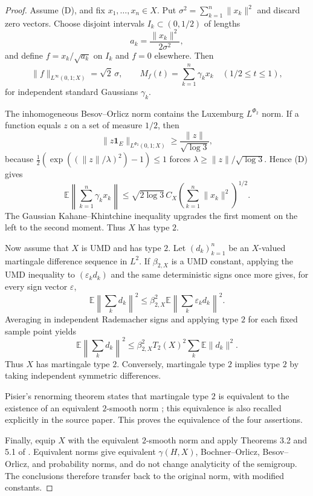 \documentclass[11pt]{article}
\newcommand{\E}{\mathbb E}
\newcommand{\PhiTwo}{\Phi_2}
\begin{document}
\begin{proof}
Assume (D), and fix $x_1,\ldots,x_n\in X$.  Put
$\sigma^2=\sum_{k=1}^n\|x_k\|^2$ and discard zero vectors.  Choose disjoint
intervals $I_k\subset(0,1/2)$ of lengths
\[
 a_k=\frac{\|x_k\|^2}{2\sigma^2},
\]
and define $f=x_k/\sqrt{a_k}$ on $I_k$ and $f=0$ elsewhere.  Then
\[
 \|f\|_{L^\infty(0,1;X)}=\sqrt{2}\,\sigma,
 \qquad
 M_f(t)=\sum_{k=1}^n\gamma_kx_k\quad(1/2\le t\le1),
\]
for independent standard Gaussians $\gamma_k$.

The inhomogeneous Besov--Orlicz norm contains the Luxemburg
$L^{\PhiTwo}$ norm.  If a function equals $z$ on a set of measure $1/2$, then
\[
 \|z\mathbf1_E\|_{L^{\PhiTwo}(0,1;X)}
 \ge \frac{\|z\|}{\sqrt{\log 3}},
\]
because $\frac12(\exp((\|z\|/\lambda)^2)-1)\le1$ forces
$\lambda\ge\|z\|/\sqrt{\log3}$.  Hence (D) gives
\[
 \E\left\|\sum_{k=1}^n\gamma_kx_k\right\|
 \le \sqrt{2\log3}\,C_X
       \left(\sum_{k=1}^n\|x_k\|^2\right)^{1/2}.
\]
The Gaussian Kahane--Khintchine inequality upgrades the first moment on the
left to the second moment.  Thus $X$ has type $2$.

Now assume that $X$ is UMD and has type $2$.  Let $(d_k)_{k=1}^n$ be an
$X$-valued martingale difference sequence in $L^2$.  If $\beta_{2,X}$ is a
UMD constant, applying the UMD inequality to $(\varepsilon_kd_k)$ and the
same deterministic signs once more gives, for every sign vector
$\varepsilon$,
\[
 \E\left\|\sum_kd_k\right\|^2
 \le\beta_{2,X}^2\E\left\|\sum_k\varepsilon_kd_k\right\|^2.
\]
Averaging in independent Rademacher signs and applying type $2$ for each
fixed sample point yields
\[
 \E\left\|\sum_kd_k\right\|^2
 \le \beta_{2,X}^2 T_2(X)^2\sum_k\E\|d_k\|^2.
\]
Thus $X$ has martingale type $2$.  Conversely, martingale type $2$ implies
type $2$ by taking independent symmetric differences.

Pisier's renorming theorem states that martingale type $2$ is equivalent to
the existence of an equivalent $2$-smooth norm \cite{Pisier}; this equivalence
is also recalled explicitly in the source paper.  This proves the equivalence
of the four assertions.

Finally, equip $X$ with the equivalent $2$-smooth norm and apply Theorems 3.2
and 5.1 of \cite{OV}.  Equivalent norms give equivalent
$\gamma(H,X)$, Bochner--Orlicz, Besov--Orlicz, and probability norms, and do
not change analyticity of the semigroup.  The conclusions therefore transfer
back to the original norm, with modified constants.
\end{proof}
\end{document}
